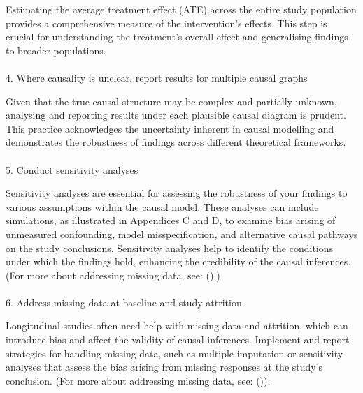 \documentclass[
  single column]{article}
\makeatletter
\let\oldparagraph\paragraph
\renewcommand{\paragraph}{
    \@ifstar
      \xxxParagraphStar
      \xxxParagraphNoStar
  }
\newcommand{\xxxParagraphStar}[1]{\oldparagraph*{#1}\mbox{}}
\newcommand{\xxxParagraphNoStar}[1]{\oldparagraph{#1}\mbox{}}
\makeatother
\begin{document}
Estimating the average treatment effect (ATE) across the entire study
population provides a comprehensive measure of the intervention's
effects. This step is crucial for understanding the treatment's overall
effect and generalising findings to broader populations.

\paragraph{4. Where causality is unclear, report results for multiple
causal
graphs}\label{where-causality-is-unclear-report-results-for-multiple-causal-graphs}

Given that the true causal structure may be complex and partially
unknown, analysing and reporting results under each plausible causal
diagram is prudent. This practice acknowledges the uncertainty inherent
in causal modelling and demonstrates the robustness of findings across
different theoretical frameworks.

\paragraph{5. Conduct sensitivity
analyses}\label{conduct-sensitivity-analyses}

Sensitivity analyses are essential for assessing the robustness of your
findings to various assumptions within the causal model. These analyses
can include simulations, as illustrated in Appendices C and D, to
examine bias arising of unmeasured confounding, model misspecification,
and alternative causal pathways on the study conclusions. Sensitivity
analyses help to identify the conditions under which the findings hold,
enhancing the credibility of the causal inferences. (For more about
addressing missing data, see:
().)

\paragraph{6. Address missing data at baseline and study
attrition}\label{address-missing-data-at-baseline-and-study-attrition}

Longitudinal studies often need help with missing data and attrition,
which can introduce bias and affect the validity of causal inferences.
Implement and report strategies for handling missing data, such as
multiple imputation or sensitivity analyses that assess the bias arising
from missing responses at the study's conclusion. (For more about
addressing missing data, see:
()).
\end{document}
